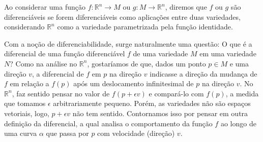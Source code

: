 Ao considerar uma função $f:\mathbb{R}^{n}\to M$ ou $g:M\to \mathbb{R}^{n}$, diremos que $f$ ou $g$ são diferenciáveis se forem diferenciáveis como aplicações entre duas variedades, considerando $\mathbb{R}^{n}$ como a variedade parametrizada pela função identidade.

Com a noção de diferenciabilidade, surge naturalmente uma questão: O que é a diferencial de uma função diferenciável $f$ de uma variedade $M$ em uma variedade $N$?
Como na análise no $\mathbb{R}^{n}$, gostaríamos de que, dados um ponto $p \in M$ e uma direção $v$, a diferencial de $f$ em $p$ na direção $v$ indicasse a direção da mudança de $f$ em relação a $f(p)$ após um deslocamento infinitesimal de $p$ na direção $v$.
No $\mathbb{R}^{n}$, faz sentido pensar no valor de $f(p+\epsilon v)$ e compará-lo com $f(p)$, a medida que tomamos $\epsilon$ arbitrariamente pequeno. Porém, as variedades não são espaços vetoriais, logo, $p+\epsilon v$ não tem sentido.
Contornamos isso por pensar em outra definição da diferencial, a qual analisa o comportamento da função $f$ ao longo de uma curva $\alpha$ que passa por $p$ com velocidade (direção) $v.$

